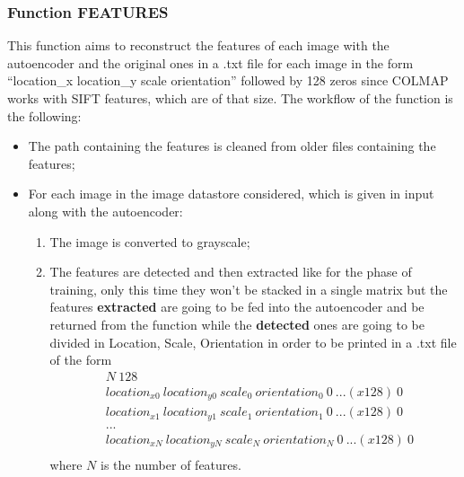 \subsubsection{Function FEATURES} \label{sec:FEATURES}
This function aims to reconstruct the features of each image with the autoencoder and the original ones in a .txt file for each image in the form ``location\_x location\_y scale orientation'' followed by 128 zeros since COLMAP works with SIFT features, which are of that size.
The workflow of the function is the following:
\begin{itemize}
\item The path containing the features is cleaned from older files containing the features;
\item For each image in the image datastore considered, which is given in input along with the autoencoder:
\begin{enumerate}
\item The image is converted to grayscale;
\item The features are detected and then extracted like for the phase of training, only this time they won't be stacked in a single matrix but the features \textbf{extracted} are going to be fed into the autoencoder and be returned from the function while the \textbf{detected} ones are going to be divided in Location, Scale, Orientation in order to be printed in a .txt file of the form
\begin{align*}
& N\ 128 \\
& location_{x0} \ location_{y0} \ scale_0 \ orientation_0 \ 0\  ... (x128)\  0 \\
& location_{x1} \ location_{y1} \ scale_1 \ orientation_1 \ 0\  ... (x128)\  0 \\
& ... \\
& location_{xN} \ location_{yN} \ scale_N \ orientation_N \ 0\  ... (x128)\  0 \\
\end{align*}  
where $N$ is the number of features.
\end{enumerate} 
\end{itemize}

